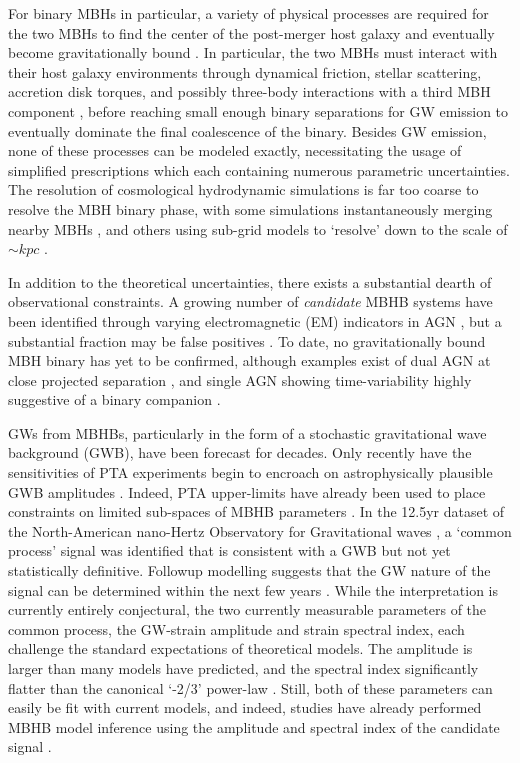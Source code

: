     For binary MBHs in particular, a variety of physical processes are required for the two MBHs to find the center of the post-merger host galaxy and eventually become gravitationally bound .  In particular, the two MBHs must interact with their host galaxy environments through dynamical friction, stellar scattering, accretion disk torques, and possibly three-body interactions with a third MBH component \needcite{}, before reaching small enough binary separations for GW emission to eventually dominate the final coalescence of the binary.  Besides GW emission, none of these processes can be modeled exactly, necessitating the usage of simplified prescriptions which each containing numerous parametric uncertainties.  The resolution of cosmological hydrodynamic simulations is far too coarse to resolve the MBH binary phase, with some simulations instantaneously merging nearby MBHs , and others using sub-grid models to `resolve' down to the scale of $\sim kpc$ .

    In addition to the theoretical uncertainties, there exists a substantial dearth of observational constraints.  A growing number of \textit{candidate} MBHB systems have been identified through varying electromagnetic (EM) indicators in AGN \needcite{}, but a substantial fraction may be false positives \needcite{}.  To date, no gravitationally bound MBH binary has yet to be confirmed, although examples exist of dual AGN at close projected separation , and single AGN showing time-variability highly suggestive of a binary companion .

    GWs from MBHBs, particularly in the form of a stochastic gravitational wave background (GWB), have been forecast for decades.  Only recently have the sensitivities of PTA experiments begin to encroach on astrophysically plausible GWB amplitudes  .  Indeed, PTA upper-limits have already been used to place constraints on limited sub-spaces of MBHB parameters .  In the 12.5yr dataset of the North-American nano-Hertz Observatory for Gravitational waves , a `common process' signal was identified that is consistent with a GWB but not yet statistically definitive.  Followup modelling suggests that the GW nature of the signal can be determined within the next few years .  While the interpretation is currently entirely conjectural, the two currently measurable parameters of the common process, the GW-strain amplitude and strain spectral index, each challenge the standard expectations of theoretical models.  The  amplitude is larger than many models have predicted, and the spectral index significantly flatter than the canonical `-2/3' power-law  .  Still, both of these parameters can easily be fit with current models, and indeed, studies have already performed MBHB model inference using the amplitude and spectral index of the candidate  signal .

